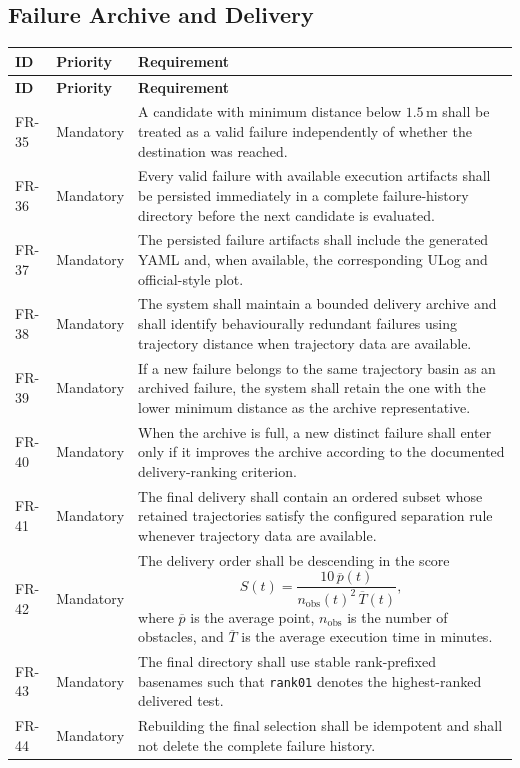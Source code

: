\documentclass[11pt,a4paper]{report}
\begin{document}
\subsection{Failure Archive and Delivery}
\begin{longtable}{L{1.7cm} L{2.1cm} L{10.8cm}}
\toprule
\textbf{ID} & \textbf{Priority} & \textbf{Requirement}\\
\midrule
\endfirsthead
\toprule
\textbf{ID} & \textbf{Priority} & \textbf{Requirement}\\
\midrule
\endhead
FR-35 & Mandatory & A candidate with minimum distance below $1.5\,\mathrm{m}$ shall be treated as a valid failure independently of whether the destination was reached.\\
FR-36 & Mandatory & Every valid failure with available execution artifacts shall be persisted immediately in a complete failure-history directory before the next candidate is evaluated.\\
FR-37 & Mandatory & The persisted failure artifacts shall include the generated YAML and, when available, the corresponding ULog and official-style plot.\\
FR-38 & Mandatory & The system shall maintain a bounded delivery archive and shall identify behaviourally redundant failures using trajectory distance when trajectory data are available.\\
FR-39 & Mandatory & If a new failure belongs to the same trajectory basin as an archived failure, the system shall retain the one with the lower minimum distance as the archive representative.\\
FR-40 & Mandatory & When the archive is full, a new distinct failure shall enter only if it improves the archive according to the documented delivery-ranking criterion.\\
FR-41 & Mandatory & The final delivery shall contain an ordered subset whose retained trajectories satisfy the configured separation rule whenever trajectory data are available.\\
FR-42 & Mandatory & The delivery order shall be descending in the score
\[
S(t)=\frac{10\,\overline{p}(t)}{n_{\mathrm{obs}}(t)^2\,\overline{T}(t)},
\]
where $\overline{p}$ is the average point, $n_{\mathrm{obs}}$ is the number of obstacles, and $\overline{T}$ is the average execution time in minutes.\\
FR-43 & Mandatory & The final directory shall use stable rank-prefixed basenames such that \texttt{rank01} denotes the highest-ranked delivered test.\\
FR-44 & Mandatory & Rebuilding the final selection shall be idempotent and shall not delete the complete failure history.\\
\bottomrule
\end{longtable}
\end{document}
